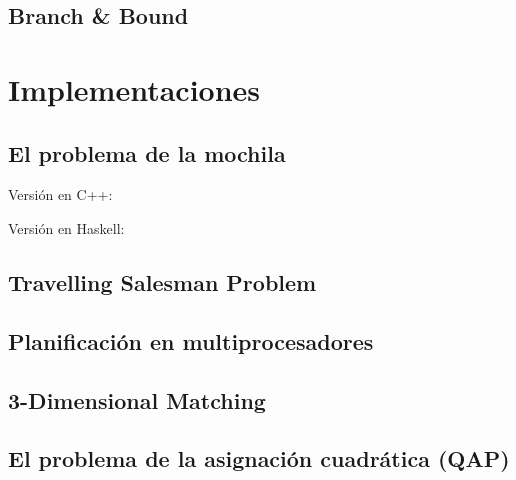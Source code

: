 \documentclass[a4paper, 11pt]{article} %
\begin{document}
  \subsection{Branch \& Bound}


\section{Implementaciones}
  \subsection{El problema de la mochila}
        Versión en C++:
        
        \small
  	\texttt{}
        \normalsize
        
        Versión en Haskell:
        
        \small
  	\texttt{}
        \normalsize
        
  \subsection{Travelling Salesman Problem}
        \small
  	\texttt{}
        \normalsize
  \subsection{Planificación en multiprocesadores}
        \small
  	\texttt{}
        \normalsize
  \subsection{3-Dimensional Matching}
        \small
  	\texttt{}
        \normalsize
  \subsection{El problema de la asignación cuadrática (QAP)}
        \small
        \normalsize

    
\end{document}
